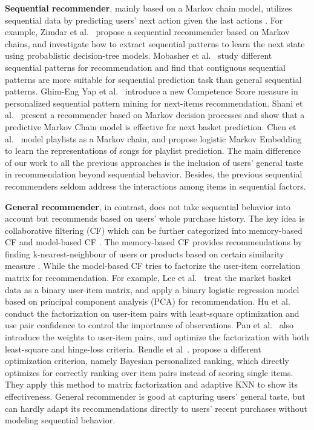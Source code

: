 \documentclass[10pt,journal,compsoc]{IEEEtran}
\begin{document}
\textbf{Sequential recommender}, mainly based on a Markov chain model, utilizes sequential data by predicting users' next action given the last actions \cite{sequential_suvery}. For example, Zimdar et al.~\cite{zimdar2001} propose a sequential recommender based on Markov chains, and investigate how to extract sequential patterns to learn the next state using probablistic decision-tree models. Mobasher et al.~\cite{Mobasher2002} study different sequential patterns for recommendation and find that contiguous sequential patterns are more suitable for sequential prediction task than general sequential patterns. Ghim-Eng Yap et al.~\cite{Yap2012} introduce a new Competence Score measure in personalized sequential pattern mining for next-items recommendation. Shani et al.~\cite{Shani2002} present a recommender based on Markov decision processes and show that a predictive Markov Chain model is effective for next basket prediction. Chen et al.~\cite{Chen2012} model playlists as a Markov chain, and propose logistic Markov Embedding to learn the representations of songs for playlist prediction. The main difference of our work to all the previous approaches is the inclusion of users' general taste in recommendation beyond sequential behavior. Besides, the previous sequential recommenders seldom address the interactions among items in sequential factors.

\textbf{General recommender}, in contrast, does not take sequential behavior into account but recommends based on users' whole purchase history. The key idea is collaborative filtering (CF) which can be further categorized into memory-based CF and model-based CF \cite{next,Su2009}. The memory-based CF provides recommendations by finding k-nearest-neighbour of users or products based on certain similarity measure \cite{amazon}. While the model-based CF tries to factorize the user-item correlation matrix for recommendation.
For example, Lee et al.~\cite{binaryBasket} treat the market basket data as a binary user-item matrix, and apply a binary logistic regression model based on principal component analysis (PCA) for recommendation. Hu et al.~\cite{Hu2008} conduct the factorization on user-item pairs with least-square optimization and use pair confidence to control the importance of observations. Pan et al.~\cite{Pan2009} also introduce the weights to user-item pairs, and optimize the factorization with both least-square and hinge-loss criteria. Rendle et al~. \cite{bpr} propose a different optimization criterion, namely Bayesian personalized ranking, which directly optimizes for correctly ranking over item pairs instead of scoring single items. They apply this method to matrix factorization and adaptive KNN to show its effectiveness. General recommender is good at capturing users' general taste, but can hardly adapt its recommendations directly to users' recent purchases without modeling sequential behavior.
\end{document}

